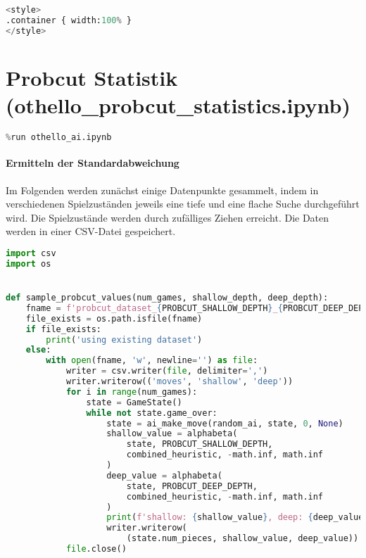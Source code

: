 \begin{lstlisting}[language=Python]
%%HTML
<style>
.container { width:100% }
</style>
\end{lstlisting}

\hypertarget{probcut-statistik-othello_probcut_statistics.ipynb}{%
\section{Probcut Statistik
(othello\_probcut\_statistics.ipynb)}\label{probcut-statistik-othello_probcut_statistics.ipynb}}

\begin{lstlisting}[language=Python]
%run othello_game.ipynb
%run othello_ai.ipynb
\end{lstlisting}

\hypertarget{ermitteln-der-standardabweichung}{%
\paragraph{Ermitteln der
Standardabweichung}\label{ermitteln-der-standardabweichung}}

Im Folgenden werden zunächst einige Datenpunkte gesammelt, indem in
verschiedenen Spielzuständen jeweils eine tiefe und eine flache Suche
durchgeführt wird. Die Spielzustände werden durch zufälliges Ziehen
erreicht. Die Daten werden in einer CSV-Datei gespeichert.

\begin{lstlisting}[language=Python]
import csv
import os


def sample_probcut_values(num_games, shallow_depth, deep_depth):
    fname = f'probcut_dataset_{PROBCUT_SHALLOW_DEPTH}_{PROBCUT_DEEP_DEPTH}.csv'
    file_exists = os.path.isfile(fname)
    if file_exists:
        print('using existing dataset')
    else:
        with open(fname, 'w', newline='') as file:
            writer = csv.writer(file, delimiter=',')
            writer.writerow(('moves', 'shallow', 'deep'))
            for i in range(num_games):
                state = GameState()
                while not state.game_over:
                    state = ai_make_move(random_ai, state, 0, None)
                    shallow_value = alphabeta(
                        state, PROBCUT_SHALLOW_DEPTH,
                        combined_heuristic, -math.inf, math.inf
                    )
                    deep_value = alphabeta(
                        state, PROBCUT_DEEP_DEPTH,
                        combined_heuristic, -math.inf, math.inf
                    )
                    print(f'shallow: {shallow_value}, deep: {deep_value}')
                    writer.writerow(
                        (state.num_pieces, shallow_value, deep_value))
            file.close()
\end{lstlisting}

